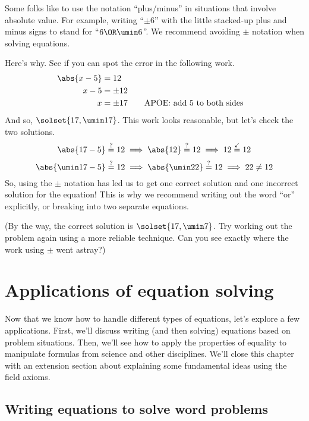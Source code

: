 \begin{boxedwarning}
Some folks like to use the notation ``plus/minus'' in situations that involve absolute value. For example, writing ``$\pm6$'' with the little stacked-up plus and minus signs to stand for ``$6 \OR \umin6$''. We recommend avoiding $\pm$ notation when solving equations.

Here's why. See if you can spot the error in the following work.
\[\begin{aligned}
\abs{x - 5} &= 12\\
x-5 &= \pm12\\
x &= \pm17
&& \text{\quad APOE: add 5 to both sides}\\
\end{aligned}\]
And so, $\solset{17, \umin17}$. This work looks reasonable, but let's check the two solutions.
\[\abs{17 - 5} \overset{?}{=} 12 \implies \abs{12} \overset{?}{=} 12 \implies 12 \overset{\checkmark}{=} 12\]
\[\abs{\umin17 - 5} \overset{?}{=} 12 \implies \abs{\umin22} \overset{?}{=} 12 \implies 22 \neq 12\]
So, using the $\pm$ notation has led us to get one correct solution and one incorrect solution for the equation! This is why we recommend writing out the word ``or'' explicitly, or breaking into two separate equations.

(By the way, the correct solution is $\solset{17, \umin7}$. Try working out the problem again using a more reliable technique. Can you see exactly where the work using $\pm$ went astray?)
\end{boxedwarning}

\section{Applications of equation solving}
\label{sec:eqsolveapplications}

Now that we know how to handle different types of equations, let's explore a few applications. First, we'll discuss writing (and then solving) equations based on problem situations. Then, we'll see how to apply the properties of equality to manipulate formulas from science and other disciplines. We'll close this chapter with an extension section about explaining some fundamental ideas using the field axioms.

\subsection{Writing equations to solve word problems}

